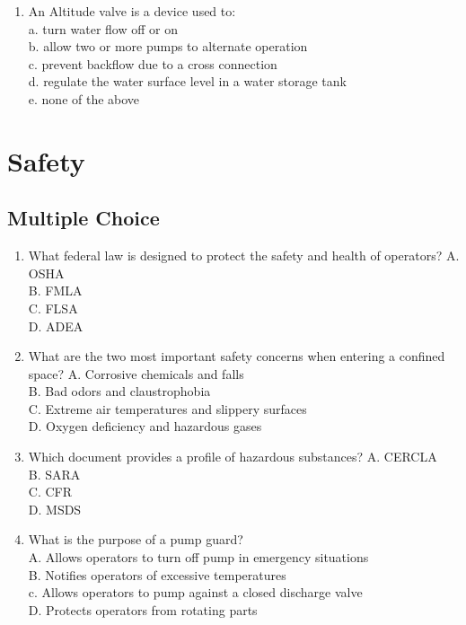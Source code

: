 \documentclass[10pt]{article}
\begin{document}
\begin{enumerate}
\begin{enumerate}
\begin{enumerate}
  \item An Altitude valve is a device used to:\\
a. turn water flow off or on\\
b. allow two or more pumps to alternate operation\\
c. prevent backflow due to a cross connection\\
d. regulate the water surface level in a water storage tank\\
e. none of the above\\

\end{enumerate}


\newpage
\section{Safety}
\subsection{Multiple Choice}
\begin{enumerate}
  \item What federal law is designed to protect the safety and health of operators?
A. OSHA\\
B. FMLA\\
C. FLSA\\
D. ADEA\\

  \item What are the two most important safety concerns when entering a confined space?
A. Corrosive chemicals and falls\\
B. Bad odors and claustrophobia\\
C. Extreme air temperatures and slippery surfaces\\
D. Oxygen deficiency and hazardous gases\\

  \item Which document provides a profile of hazardous substances?
A. CERCLA\\
B. SARA\\
C. CFR\\
D. MSDS\\

  \item What is the purpose of a pump guard?\\
A. Allows operators to turn off pump in emergency situations\\
B. Notifies operators of excessive temperatures\\
c. Allows operators to pump against a closed discharge valve\\
D. Protects operators from rotating parts\\


\end{enumerate}
\end{enumerate}
\end{enumerate}
\end{document}

